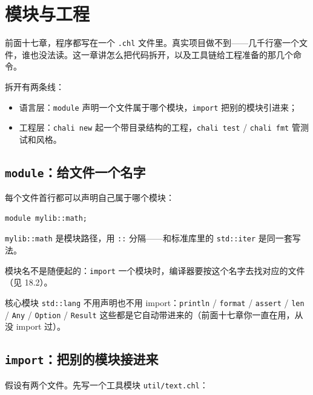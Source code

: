 \chapter{模块与工程}
\label{ch:18}

前面十七章，程序都写在一个 \texttt{.\allowbreak{}chl} 文件里。真实项目做不到——几千行塞一个文件，谁也没法读。这一章讲怎么把代码拆开，以及工具链给工程准备的那几个命令。

拆开有两条线：

\begin{itemize}

\item 语言层：\texttt{module} 声明一个文件属于哪个模块，\texttt{import} 把别的模块引进来；

\item 工程层：\texttt{chali new} 起一个带目录结构的工程，\texttt{chali test} / \texttt{chali fmt} 管测试和风格。

\end{itemize}

\section{\texttt{module}：给文件一个名字}

每个文件首行都可以声明自己属于哪个模块：

\par
\medskip
\begin{lstlisting}[style=chali]
module mylib::math;
\end{lstlisting}
\par
\medskip

\texttt{mylib:\allowbreak{}:\allowbreak{}math} 是模块路径，用 \texttt{:\allowbreak{}:\allowbreak{}} 分隔——和标准库里的 \texttt{std:\allowbreak{}:\allowbreak{}iter} 是同一套写法。

模块名不是随便起的：\texttt{import} 一个模块时，编译器要按这个名字去找对应的文件（见 18.2）。

核心模块 \texttt{std:\allowbreak{}:\allowbreak{}lang} 不用声明也不用 import：\texttt{println} / \texttt{format} / \texttt{assert} / \texttt{len} / \texttt{Any} / \texttt{Option} / \texttt{Result} 这些都是它自动带进来的（前面十七章你一直在用，从没 import 过）。

\section{\texttt{import}：把别的模块接进来}

假设有两个文件。先写一个工具模块 \texttt{util/\allowbreak{}text.\allowbreak{}chl}：

